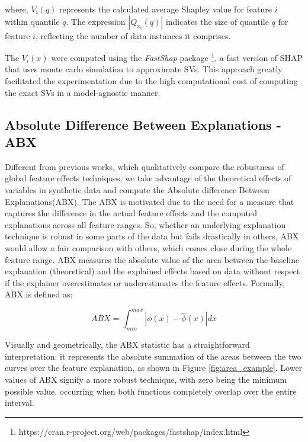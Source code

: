 where, \(\bar{V}_{i}(q)\) represents the calculated average Shapley value for feature \(i\) within quantile \(q\). The expression \(|Q_{x_i}(q)|\) indicates the size of quantile \(q\) for feature \(i\), reflecting the number of data instances it comprises. 

The \(V_i(x)\) were computed using the \textit{FastShap} package \footnote{https://cran.r-project.org/web/packages/fastshap/index.html}, a fast version of \gls{SHAP} that uses monte carlo simulation to approximate SVs. This approach greatly facilitated the experimentation due to the high computational cost of computing the exact SVs in a model-agnostic manner. 

\subsection{Absolute Difference Between Explanations - ABX}

Different from previous works, which qualitatively compare the robustness of global feature effects techniques, we take advantage of the theoretical effects of variables in synthetic data and compute the Absolute difference Between Explanations(ABX). The \gls{ABX} is motivated due to the need for a measure that captures the difference in the actual feature effects and the computed explanations across all feature ranges. So, whether an underlying explanation technique is robust in some parts of the data but fails drastically in others, \gls{ABX} would allow a fair comparison with others, which comes close during the whole feature range. \gls{ABX} measures the absolute value of the area between the baseline explanation (theoretical) and the explained effects based on data without respect if the explainer overestimates or underestimates the feature effects. Formally, \gls{ABX} is defined as:

\begin{equation}
ABX = \int_{min}^{max} |\phi(x) - \hat{\phi}(x)| dx
\label{abx}
\end{equation}

Visually and geometrically, the \gls{ABX} statistic has a straightforward interpretation: it represents the absolute summation of the areas between the two curves over the feature explanation, as shown in Figure \ref{fig:area_example}.  Lower values of \gls{ABX} signify a more robust technique, with zero being the minimum possible value, occurring when both functions completely overlap over the entire interval.

